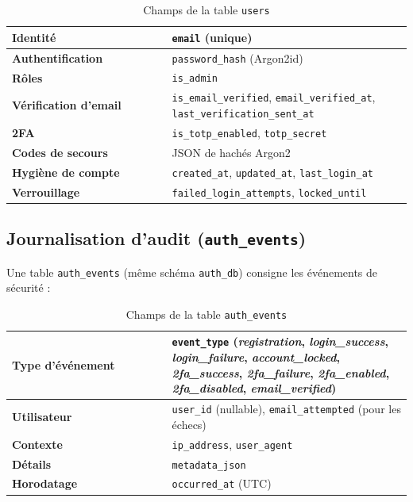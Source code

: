 \begin{table}[H]
\centering
\caption{Champs de la table \texttt{users}}
\label{tab:chap10_users_fields}
\noindent\begin{tabular}{@{}p{0.40\linewidth}p{0.60\linewidth}@{}}
\textbf{Identité} & \texttt{email} (unique) \\
\hline
\textbf{Authentification} & \texttt{password\_hash} (Argon2id) \\
\hline
\textbf{Rôles} & \texttt{is\_admin} \\
\hline
\textbf{Vérification d'email} & \texttt{is\_email\_verified}, \texttt{email\_verified\_at}, \texttt{last\_verification\_sent\_at} \\
\hline
\textbf{2FA} & \texttt{is\_totp\_enabled}, \texttt{totp\_secret} \\
\hline
\textbf{Codes de secours} & JSON de hachés Argon2 \\
\hline
\textbf{Hygiène de compte} & \texttt{created\_at}, \texttt{updated\_at}, \texttt{last\_login\_at} \\
\hline
\textbf{Verrouillage} & \texttt{failed\_login\_attempts}, \texttt{locked\_until} \\
\end{tabular}
\end{table}


\subsection*{Journalisation d'audit (\texttt{auth\_events})}
\noindent Une table \texttt{auth\_events} (même schéma \texttt{auth\_db}) consigne les événements de sécurité :

\begin{table}[H]
\centering
\caption{Champs de la table \texttt{auth\_events}}
\label{tab:chap10_auth_events_fields}
\noindent\begin{tabular}{@{}p{0.40\linewidth}p{0.60\linewidth}@{}}
\textbf{Type d'événement} & \texttt{event\_type} (\textit{registration}, \textit{login\_success}, \textit{login\_failure}, \textit{account\_locked}, \textit{2fa\_success}, \textit{2fa\_failure}, \textit{2fa\_enabled}, \textit{2fa\_disabled}, \textit{email\_verified}) \\
\hline
\textbf{Utilisateur} & \texttt{user\_id} (nullable), \texttt{email\_attempted} (pour les échecs) \\
\hline
\textbf{Contexte} & \texttt{ip\_address}, \texttt{user\_agent} \\
\hline
\textbf{Détails} & \texttt{metadata\_json} \\
\hline
\textbf{Horodatage} & \texttt{occurred\_at} (UTC) \\
\end{tabular}
\end{table}


